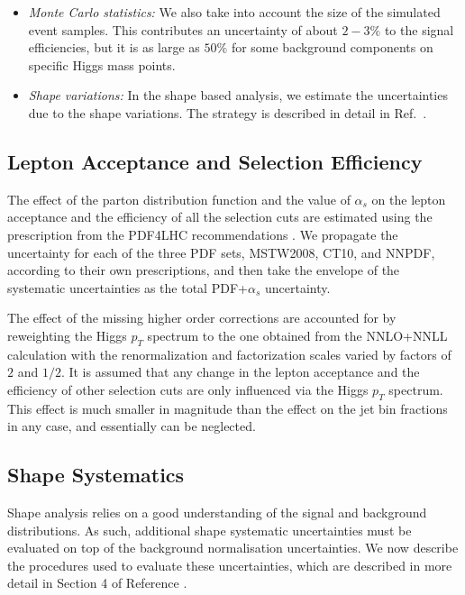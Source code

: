 \begin{itemize}
\item {\it Monte Carlo statistics:} We also take into account the 
size of the simulated event samples. 
This contributes an uncertainty of about $2-3\%$ to the signal
efficiencies, but it is as large as $50\%$ for some background components on specific
Higgs mass points.

\item {\it Shape variations:} In the shape based analysis, we estimate the 
uncertainties due to the shape variations. The strategy is described in detail in Ref.~\cite{shapeananote}.
\end{itemize}



\subsection{Lepton Acceptance and Selection Efficiency }

The effect of the parton distribution function and the value of $\alpha_{s}$
 on the lepton acceptance and the efficiency of all the selection cuts are 
estimated using the prescription from the PDF4LHC recommendations \cite{PDF4LHC}. We 
propagate the uncertainty for each of the three PDF sets, MSTW2008, CT10, and
NNPDF, according to their own prescriptions, and then take the envelope
of the systematic uncertainties as the total PDF+$\alpha_{s}$  uncertainty. 

The effect of the missing higher order corrections are accounted for by
reweighting the Higgs $p_{T}$ spectrum to the one obtained from the
NNLO+NNLL calculation with the renormalization and factorization scales
varied by factors of $2$ and $1/2$. It is assumed that any change in the
lepton acceptance and the efficiency of other selection cuts are only
influenced via the Higgs $p_{T}$ spectrum. This effect is much smaller in 
magnitude than the effect on the jet bin fractions in any case, and 
essentially can be neglected.

\subsection{Shape Systematics}

Shape analysis relies on a good understanding of the signal and background distributions. 
As such, additional shape systematic uncertainties must be evaluated
on top of the background normalisation uncertainties. 
We now describe the procedures used to evaluate these uncertainties,
which are described in more detail in Section 4 of Reference \cite{shapeananote}.	

